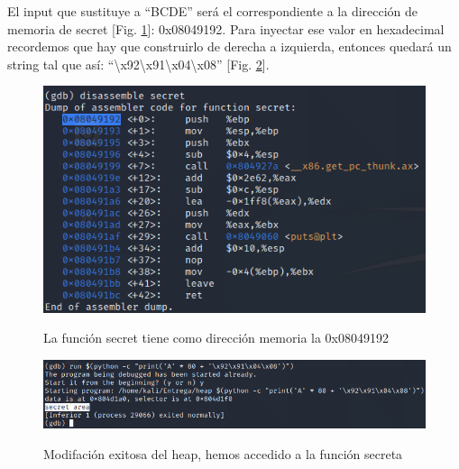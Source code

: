 \documentclass[10pt,a4paper]{article}
\begin{document}
El input que sustituye a ``BCDE'' será el correspondiente a la dirección de memoria de secret [Fig. \ref{fig:figura7}]: 0x08049192. Para inyectar ese valor en hexadecimal recordemos que hay que construirlo de derecha a izquierda, entonces quedará un string tal que así: ``\textbackslash x92\textbackslash x91\textbackslash x04\textbackslash x08'' [Fig. \ref{fig:figura8}].
\begin{figure}[h!]
  \centering
  \includegraphics[scale=0.6]{3.png}\\
  \caption{La función secret tiene como dirección memoria la 0x08049192}
  \label{fig:figura7}
\end{figure}

\begin{figure}[h!]
  \centering
  \includegraphics[scale=0.5]{6.png}\\
  \caption{Modifación exitosa del heap, hemos accedido a la función secreta}
  \label{fig:figura8}
\end{figure}


\pagebreak
\end{document}
